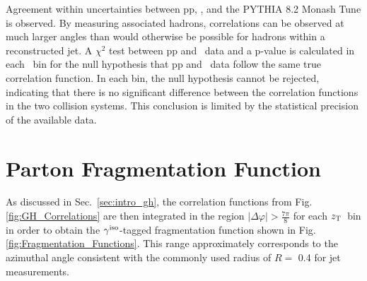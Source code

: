 

Agreement within uncertainties between pp, \pPb, and the \textsc{PYTHIA 8.2} Monash Tune is observed.
By measuring associated hadrons, correlations can be observed at much larger angles than would otherwise be possible for hadrons within a reconstructed jet. A $\chi^2$ test between pp and \pPb~data and a p-value is calculated in each \zt~bin for the null hypothesis that pp and \pPb~data follow the same true correlation function. In each bin, the null hypothesis cannot be rejected, indicating that there is no significant difference between the correlation functions in the two collision systems. This conclusion is limited by the statistical precision of the available data.

\section{Parton Fragmentation Function}
As discussed in Sec.~\ref{sec:intro_gh}, the correlation functions from Fig. \ref{fig:GH_Correlations} are then integrated in the region $|\Delta\varphi| > \frac{7\pi}{8}$ for each $z_{\mathrm{T}}$~bin in order to obtain the $\gamma^\mathrm{iso}$-tagged fragmentation function shown in Fig. \ref{fig:Fragmentation_Functions}. This range approximately corresponds to the azimuthal angle consistent with the commonly used radius of $R=$ 0.4 for jet measurements.


